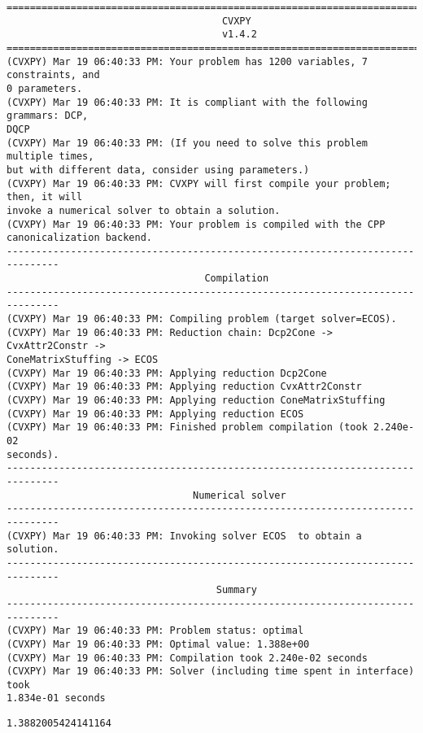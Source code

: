 \documentclass[11pt]{article}
\makeatletter
\newcommand{\boxspacing}{\kern\kvtcb@left@rule\kern\kvtcb@boxsep}
\newcommand{\prompt}[4]{
        {\ttfamily\llap{{\color{#2}[#3]:\hspace{3pt}#4}}\vspace{-\baselineskip}}
    }
\makeatother
\begin{document}
    \begin{Verbatim}[commandchars=\\\{\}]
===============================================================================
                                     CVXPY
                                     v1.4.2
===============================================================================
(CVXPY) Mar 19 06:40:33 PM: Your problem has 1200 variables, 7 constraints, and
0 parameters.
(CVXPY) Mar 19 06:40:33 PM: It is compliant with the following grammars: DCP,
DQCP
(CVXPY) Mar 19 06:40:33 PM: (If you need to solve this problem multiple times,
but with different data, consider using parameters.)
(CVXPY) Mar 19 06:40:33 PM: CVXPY will first compile your problem; then, it will
invoke a numerical solver to obtain a solution.
(CVXPY) Mar 19 06:40:33 PM: Your problem is compiled with the CPP
canonicalization backend.
-------------------------------------------------------------------------------
                                  Compilation
-------------------------------------------------------------------------------
(CVXPY) Mar 19 06:40:33 PM: Compiling problem (target solver=ECOS).
(CVXPY) Mar 19 06:40:33 PM: Reduction chain: Dcp2Cone -> CvxAttr2Constr ->
ConeMatrixStuffing -> ECOS
(CVXPY) Mar 19 06:40:33 PM: Applying reduction Dcp2Cone
(CVXPY) Mar 19 06:40:33 PM: Applying reduction CvxAttr2Constr
(CVXPY) Mar 19 06:40:33 PM: Applying reduction ConeMatrixStuffing
(CVXPY) Mar 19 06:40:33 PM: Applying reduction ECOS
(CVXPY) Mar 19 06:40:33 PM: Finished problem compilation (took 2.240e-02
seconds).
-------------------------------------------------------------------------------
                                Numerical solver
-------------------------------------------------------------------------------
(CVXPY) Mar 19 06:40:33 PM: Invoking solver ECOS  to obtain a solution.
-------------------------------------------------------------------------------
                                    Summary
-------------------------------------------------------------------------------
(CVXPY) Mar 19 06:40:33 PM: Problem status: optimal
(CVXPY) Mar 19 06:40:33 PM: Optimal value: 1.388e+00
(CVXPY) Mar 19 06:40:33 PM: Compilation took 2.240e-02 seconds
(CVXPY) Mar 19 06:40:33 PM: Solver (including time spent in interface) took
1.834e-01 seconds
    \end{Verbatim}

            \begin{tcolorbox}[breakable, size=fbox, boxrule=.5pt, pad at break*=1mm, opacityfill=0]
\prompt{Out}{outcolor}{6}{\boxspacing}
\begin{Verbatim}[commandchars=\\\{\}]
1.3882005424141164
\end{Verbatim}
\end{tcolorbox}
        
\end{document}
